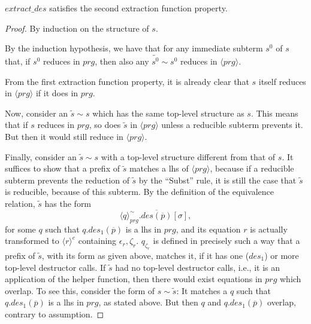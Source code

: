 \begin{lemma}

$extract\_des$ satisfies the second extraction function property.

\begin{proof}

By induction on the structure of $s$.

By the induction hypothesis, we have that for any immediate subterm $s^0$ of $s$ that, if $s^0$ reduces in $prg$, then also any $\widetilde{s^0} \sim s^0$ reduces in $\langle prg \rangle$.

From the first extraction function property, it is already clear that $s$ itself reduces in $\langle prg \rangle$ if it does in $prg$.

Now, consider an $\widetilde{s} \sim s$ which has the same top-level structure as $s$. This means that if $s$ reduces in $prg$, so does $\widetilde{s}$ in $\langle prg \rangle$ unless a reducible subterm prevents it. But then it would still reduce in $\langle prg \rangle$.

Finally, consider an $\widetilde{s} \sim s$ with a top-level structure different from that of $s$. It suffices to show that a prefix of $\widetilde{s}$ matches a lhs of $\langle prg \rangle$, because if a reducible subterm prevents the reduction of $\widetilde{s}$ by the ``Subst'' rule, it is still the case that $\widetilde{s}$ is reducible, because of this subterm. By the definition of the equivalence relation, $\widetilde{s}$ has the form
\begin{equation*}
\langle q \rangle^{\sim}_{prg}.\overline{des(\overline{p})}[\sigma],
\end{equation*}
for some $q$ such that $q.des_1(\overline{p})$ is a lhs in $prg$, and its equation $r$ is actually transformed to $\langle r \rangle^e$ containing $\epsilon_r, \zeta_r$. $q_{\zeta_r}$ is defined in precisely such a way that a prefix of $\widetilde{s}$, with its form as given above, matches it, if it has one ($des_1$) or more top-level destructor calls. If $\widetilde{s}$ had no top-level destructor calls, i.e., it is an application of the helper function, then there would exist equations in $prg$ which overlap. To see this, consider the form of $s \sim \widetilde{s}$: It matches a $q$ such that $q.des_1(\overline{p})$ is a lhs in $prg$, as stated above. But then $q$ and $q.des_1(\overline{p})$ overlap, contrary to assumption.

\end{proof}

\end{lemma}


